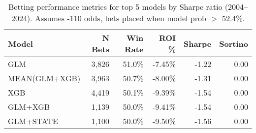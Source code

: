 \begin{table}[t]
  \centering
  \small
  \caption[Betting performance metrics]{Betting performance metrics for top 5 models by Sharpe ratio (2004--2024). Assumes -110 odds, bets placed when model prob $>$ 52.4\%.}
  \label{tab:betting-performance}
  \setlength{\tabcolsep}{3pt}\renewcommand{\arraystretch}{1.12}
  \begin{tabular}{@{} l r r r r r @{} }
    \toprule
    \textbf{Model} & \textbf{N Bets} & \textbf{Win Rate} & \textbf{ROI \%} & \textbf{Sharpe} & \textbf{Sortino} \\
    \midrule
    GLM & 3,826 & 51.0\% & -7.45\% & -1.22 & 0.00 \\
    MEAN(GLM+XGB) & 3,963 & 50.7\% & -8.00\% & -1.31 & 0.00 \\
    XGB & 4,419 & 50.1\% & -9.39\% & -1.54 & 0.00 \\
    GLM+XGB & 1,139 & 50.0\% & -9.41\% & -1.54 & 0.00 \\
    GLM+STATE & 1,100 & 50.0\% & -9.50\% & -1.56 & 0.00 \\
    \bottomrule
  \end{tabular}
\end{table}
